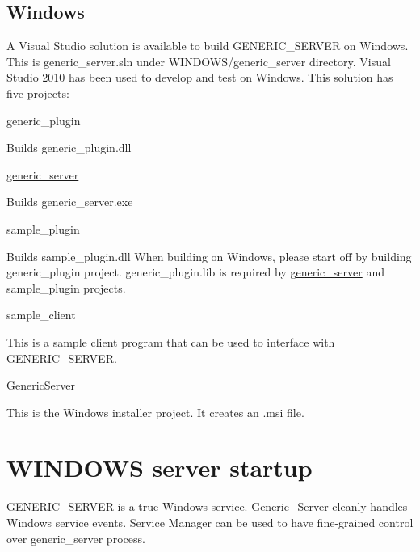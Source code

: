 \hypertarget{index_BW}{}\subsection{Windows}\label{index_BW}
A Visual Studio solution is available to build G\-E\-N\-E\-R\-I\-C\-\_\-\-S\-E\-R\-V\-E\-R on Windows. This is generic\-\_\-server.\-sln under W\-I\-N\-D\-O\-W\-S/generic\-\_\-server directory. Visual Studio 2010 has been used to develop and test on Windows. This solution has five projects\-: \begin{DoxyItemize}
\item generic\-\_\-plugin \par
 Builds generic\-\_\-plugin.\-dll \par
 \par
 \item \hyperlink{classgeneric__server}{generic\-\_\-server} \par
 Builds generic\-\_\-server.\-exe \par
 \par
 \item sample\-\_\-plugin \par
 Builds sample\-\_\-plugin.\-dll When building on Windows, please start off by building generic\-\_\-plugin project. generic\-\_\-plugin.\-lib is required by \hyperlink{classgeneric__server}{generic\-\_\-server} and sample\-\_\-plugin projects. \par
 \par
 \item sample\-\_\-client \par
 This is a sample client program that can be used to interface with G\-E\-N\-E\-R\-I\-C\-\_\-\-S\-E\-R\-V\-E\-R. \par
 \par
 \item Generic\-Server \par
 This is the Windows installer project. It creates an .msi file. \par
 \par
 \end{DoxyItemize}
\hypertarget{index_WI}{}\section{W\-I\-N\-D\-O\-W\-S server startup}\label{index_WI}
\begin{DoxyVerb}  GENERIC_SERVER is a true Windows service. Generic_Server cleanly handles Windows service events. Service
  Manager can be used to have fine-grained control over generic_server process.
\end{DoxyVerb}
